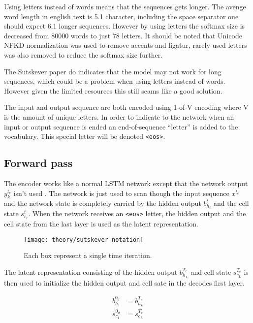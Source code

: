 Using letters instead of words means that the sequences gets longer. The avenge word length in english text is 5.1 character, including the space separator one should expect 6.1 longer sequences. However by using letters the softmax size is decreased from 80000 words to just 78 letters. It should be noted that Unicode NFKD normalization \cite{unicode-normalization} was used to remove accents and ligatur, rarely used letters was also removed to reduce the softmax size further.

The Sutskever paper \cite{sutskever} do indicates that the model may not work for long sequences, which could be a problem when using letters instead of words. However given the limited resources this still seams like a good solution.

The input and output sequence are both encoded using 1-of-V encoding where V is the amount of unique letters. In order to indicate to the network when an input or output sequence is ended an end-of-sequence ``letter'' is added to the vocabulary. This special letter will be denoted \texttt{<eos>}.


\subsection{Forward pass}

The encoder works like a normal LSTM network except that the network output $y_k^{t_e}$ isn't used . The network is just used to scan though the input sequence $x^{t_e}$ and the network state is completely carried by the hidden output $b_{h_\ell}^t$ and the cell state $s_{c_\ell}^t$. When the network receives an \texttt{<eos>} letter, the hidden output and the cell state from the last layer is used as the latent representation.

\begin{figure}[H]
	\centering
	\texttt{[image: theory/sutskever-notation]}
	\caption{Each box represent a single time iteration.}
\end{figure}

The latent representation consisting of the hidden output $b_{h_{L}}^{T_e}$ and cell state $s_{c_{L}}^{T_e}$ is then used to initialize the hidden output and cell sate in the decodes first layer.

\begin{equation}
\begin{aligned}
b_{h_1}^{0_d} &= b_{h_{L}}^{T_e} \\
s_{c_1}^{0_d} &= s_{c_{L}}^{T_e}
\end{aligned}
\end{equation}

